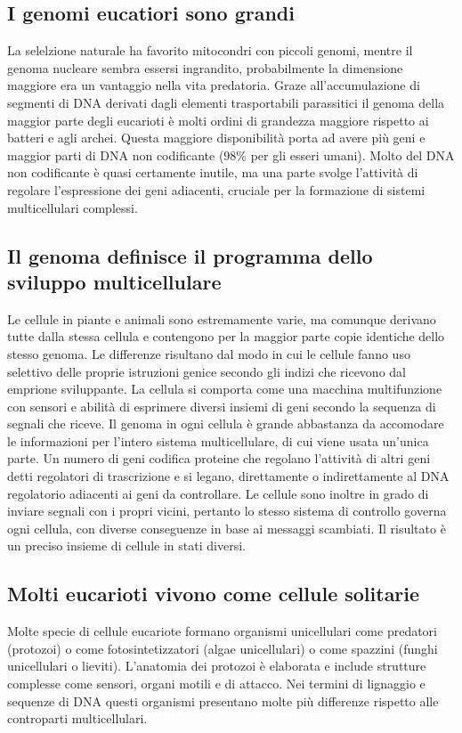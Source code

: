 \subsection{I genomi eucatiori sono grandi}
La selelzione naturale ha favorito mitocondri con piccoli genomi, mentre il genoma nucleare sembra essersi ingrandito, probabilmente la dimensione maggiore era un vantaggio nella vita
predatoria. Graze all'accumulazione di segmenti di DNA derivati dagli elementi trasportabili parassitici il genoma della maggior parte degli eucarioti \`e molti ordini di grandezza 
maggiore rispetto ai batteri e agli archei. Questa maggiore disponibilit\`a porta ad avere pi\`u geni e maggior parti di DNA non codificante ($98\%$ per gli esseri umani).
Molto del DNA non codificante \`e quasi certamente inutile, ma una parte svolge l'attivit\`a di regolare l'espressione dei geni adiacenti, cruciale per la formazione di sistemi 
multicellulari complessi. 
\subsection{Il genoma definisce il programma dello sviluppo multicellulare}
Le cellule in piante e animali sono estremamente varie, ma comunque derivano tutte dalla stessa cellula e contengono per la maggior parte copie identiche dello stesso genoma. Le 
differenze risultano dal modo in cui le cellule fanno uso selettivo delle proprie istruzioni genice secondo gli indizi che ricevono dal emprione sviluppante. La cellula si comporta come
una macchina multifunzione con sensori e abilit\`a di esprimere diversi insiemi di geni secondo la sequenza di segnali che riceve. Il genoma in ogni cellula \`e grande abbastanza da
accomodare le informazioni per l'intero sistema multicellulare, di cui viene usata un'unica parte. Un numero di geni codifica proteine che regolano l'attivit\`a di altri geni detti
regolatori di trascrizione e si legano, direttamente o indirettamente al DNA regolatorio adiacenti ai geni da controllare. Le cellule sono inoltre in grado di inviare segnali con i 
propri vicini, pertanto lo stesso sistema di controllo governa ogni cellula, con diverse conseguenze in base ai messaggi scambiati. Il risultato \`e un preciso insieme di cellule in 
stati diversi. 
\subsection{Molti eucarioti vivono come cellule solitarie}
Molte specie di cellule eucariote formano organismi unicellulari come predatori (protozoi) o come fotosintetizzatori (algae unicellulari) o come spazzini
(funghi unicellulari o lieviti). L'anatomia dei protozoi \`e elaborata e include strutture complesse come sensori, organi motili e di attacco. Nei termini
di lignaggio e sequenze di DNA questi organismi presentano molte pi\`u differenze rispetto alle controparti multicellulari. 
